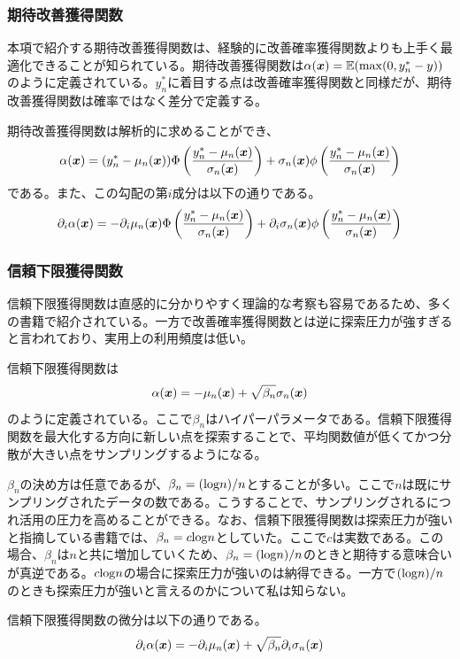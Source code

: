\documentclass[dvipdfmx, 9pt, a4paper]{jsarticle}
\numberwithin{equation}{section}
\newcommand{\bm}[1]{{\mbox{\boldmath $#1$}}}
\begin{document}
\subsubsection{期待改善獲得関数}
本項で紹介する期待改善獲得関数は、経験的に改善確率獲得関数よりも上手く最適化できることが知られている。期待改善獲得関数は$\alpha(\bm x)=\mathbb{E}({\rm max}(0, y^*_n-y))$のように定義されている。$y^*_n$に着目する点は改善確率獲得関数と同様だが、期待改善獲得関数は確率ではなく差分で定義する。\par
期待改善獲得関数は解析的に求めることができ、
\begin{equation}
\alpha(\bm x)=(y^*_n-\mu_n(\bm x))\Phi\left(\frac{y^*_n-\mu_n(\bm x)}{\sigma_n(\bm x)}\right)+\sigma_n(\bm x)\phi\left(\frac{y^*_n-\mu_n(\bm x)}{\sigma_n(\bm x)}\right)
\end{equation}
である。また、この勾配の第$i$成分は以下の通りである。
\begin{equation}
\partial_i\alpha(\bm x)=-\partial_i\mu_n(\bm x)\Phi\left(\frac{y^*_n-\mu_n(\bm x)}{\sigma_n(\bm x)}\right)+\partial_i\sigma_n(\bm x)\phi\left(\frac{y^*_n-\mu_n(\bm x)}{\sigma_n(\bm x)}\right)
\end{equation}

\subsubsection{信頼下限獲得関数}
信頼下限獲得関数は直感的に分かりやすく理論的な考察も容易であるため、多くの書籍で紹介されている。一方で改善確率獲得関数とは逆に探索圧力が強すぎると言われており、実用上の利用頻度は低い。\par
信頼下限獲得関数は
\begin{equation}
\alpha(\bm x)=-\mu_n(\bm x)+\sqrt{\beta_n}\sigma_n(\bm x)
\end{equation}
のように定義されている。ここで$\beta_n$はハイパーパラメータである。信頼下限獲得関数を最大化する方向に新しい点を探索することで、平均関数値が低くてかつ分散が大きい点をサンプリングするようになる。\par
$\beta_n$の決め方は任意であるが、$\beta_n=({\rm log}n)/n$とすることが多い。ここで$n$は既にサンプリングされたデータの数である。こうすることで、サンプリングされるにつれ活用の圧力を高めることができる。なお、信頼下限獲得関数は探索圧力が強いと指摘している書籍では、$\beta_n=c{\rm log}n$としていた。ここで$c$は実数である。この場合、$\beta_n$は$n$と共に増加していくため、$\beta_n=({\rm log}n)/n$のときと期待する意味合いが真逆である。$c{\rm log}n$の場合に探索圧力が強いのは納得できる。一方で$({\rm log}n)/n$のときも探索圧力が強いと言えるのかについて私は知らない。\par
信頼下限獲得関数の微分は以下の通りである。
\begin{equation}
\partial_i\alpha(\bm x)=-\partial_i\mu_n(\bm x)+\sqrt{\beta_n}\partial_i\sigma_n(\bm x)
\end{equation}
\end{document}

